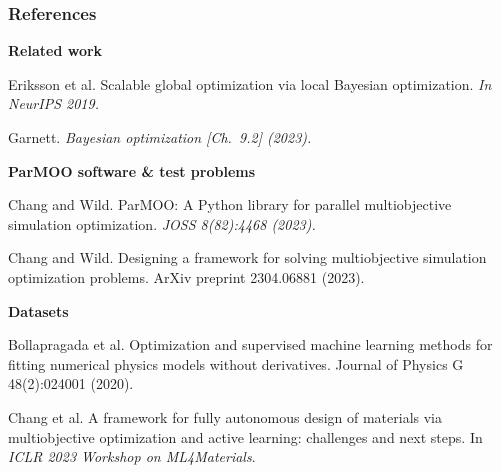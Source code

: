 \documentclass[aspectratio=169]{beamer}
\begin{document}
\begin{frame}\frametitle{References}

{\small\bf Related work}\\

{\tiny\it

%
%
%
%
%
%
%

%
%
%
%
%

Eriksson et al.
Scalable global optimization via local Bayesian optimization.
{\sl In NeurIPS 2019.}

\medskip

Garnett. {\sl Bayesian optimization [Ch.\ 9.2] (2023).}

}

\medskip

{\small\bf ParMOO software \& test problems}\\

{\tiny\it

Chang and Wild.
ParMOO: A Python library for parallel multiobjective simulation optimization.
{\sl JOSS 8(82):4468 (2023).}

\medskip

Chang and Wild.
Designing a framework for solving multiobjective simulation optimization problems.
ArXiv preprint 2304.06881 (2023).

}

\medskip

{\small\bf Datasets}\\

{\tiny\it

Bollapragada et al.
Optimization and supervised machine learning methods for fitting numerical physics models without derivatives.
Journal of Physics G 48(2):024001 (2020).

\medskip

Chang et al.
A framework for fully autonomous design of materials via multiobjective optimization and active learning: challenges and next steps.
In {\sl ICLR 2023 Workshop on ML4Materials}.

}
\end{frame}
\end{document}
